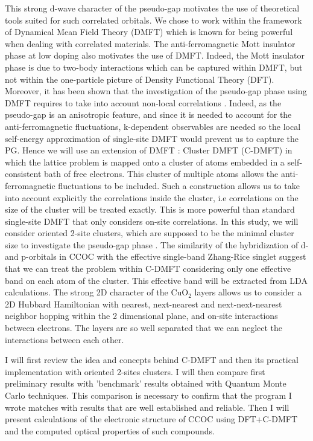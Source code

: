 \documentclass[12pt]{article}
\begin{document}
\begin{multicols}{2}
\begin{figure}
    \label{CCOC-struct}
\end{figure}
This strong d-wave character of the pseudo-gap motivates the use of theoretical 
tools suited for such correlated orbitals. We chose to work within the framework 
of Dynamical Mean Field Theory \cite{Review-georges} (DMFT) which is known for 
being powerful when dealing with correlated materials. The anti-ferromagnetic 
Mott insulator phase at low doping also motivates the use of DMFT. Indeed, the 
Mott insulator phase is due to two-body interactions which can be captured 
within DMFT, but not within the one-particle picture of Density Functional 
Theory (DFT). Moreover, it has been shown that the investigation of the 
pseudo-gap phase using DMFT requires to take into account non-local correlations 
\cite{huscroft2001pseudogaps,lichtenstein2000antiferromagnetism}. Indeed, as the 
pseudo-gap is an anisotropic feature, and since it is needed to account for the 
anti-ferromagnetic fluctuations, k-dependent observables are needed so the local 
self-energy approximation of single-site DMFT would prevent us to capture the 
PG. Hence we will use an extension of DMFT : Cluster DMFT (C-DMFT) 
\cite{kotlier-CDMFT,maier-cluster-theories} in which the lattice problem is 
mapped onto a cluster of atoms embedded in a self-consistent bath of free 
electrons. This cluster of multiple atoms allows the anti-ferromagnetic 
fluctuations to be included. Such a construction allows us to take into account 
explicitly the correlations inside the cluster, i.e correlations on the size of 
the cluster will be treated exactly. This is more powerful than standard 
single-site DMFT that only considers on-site correlations. In this study, we 
will consider oriented 2-site clusters, which are supposed to be the minimal 
cluster size to investigate the pseudo-gap phase 
\cite{huscroft2001pseudogaps,lichtenstein2000antiferromagnetism}. The similarity 
of the hybridization of d- and p-orbitals in CCOC with the effective single-band 
Zhang-Rice singlet suggest that we can treat the problem within C-DMFT 
considering only one effective band on each atom of the cluster. This effective 
band will be extracted from LDA calculations. The strong 2D character of the 
$\mathrm{CuO_{2}}$ layers allows us to consider a 2D Hubbard Hamiltonian with 
nearest, next-nearest and next-next-nearest neighbor hopping within the 2 
dimensional plane, and on-site interactions between electrons. The layers are so 
well separated that we can neglect the interactions between each other. \par I 
will first review the idea and concepts behind C-DMFT and then its practical 
implementation with oriented 2-sites clusters. I will then compare first 
preliminary results with 'benchmark' results \cite{benchmark2Dcubic} obtained 
with Quantum Monte Carlo  techniques. This comparison is necessary to confirm 
that the program I wrote matches with results that are well established and 
reliable. Then I will present calculations of the electronic structure of CCOC 
using DFT+C-DMFT and the computed optical properties of such compounds.
\end{multicols}
\end{document}
